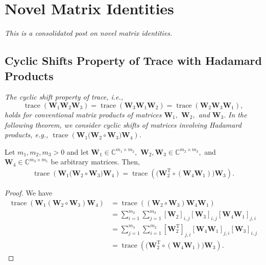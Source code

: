 \section{Novel Matrix Identities}

\emph{This is a consolidated post on novel matrix identities.}

\subsection{Cyclic Shifts Property of Trace with Hadamard Products}

\emph{The cyclic shift property of trace, i.e., 
\begin{equation*}
	\operatorname{trace}\left(\boldsymbol{W}_1\boldsymbol{W}_2\boldsymbol{W}_3\right) = \operatorname{trace}\left(\boldsymbol{W}_3\boldsymbol{W}_1\boldsymbol{W}_2\right) = \operatorname{trace}\left(\boldsymbol{W}_2\boldsymbol{W}_3\boldsymbol{W}_1\right),
\end{equation*}
holds for conventional matrix products of matrices $\boldsymbol{W}_1,$ $\boldsymbol{W}_2,$ and $\boldsymbol{W}_3.$ In the following theorem, we consider cyclic shifts of matrices involving Hadamard products, e.g., $\operatorname{trace}\left(\boldsymbol{W}_1\big(\boldsymbol{W}_2 \circ \boldsymbol{W}_3\big) \boldsymbol{W}_4\right).$}

\begin{theorem}
	\label{lemma:htoc}
	Let $m_1, m_2, m_3 > 0$ and let $\boldsymbol{W}_1 \in \mathbb{C}^{m_1\times m_2},$ $\boldsymbol{W}_2, \boldsymbol{W}_3 \in \mathbb{C}^{m_2\times m_3},$ and $\boldsymbol{W}_4 \in \mathbb{C}^{m_3\times m_1}$ be arbitrary matrices. Then,
	\begin{align}
		\operatorname{trace}\left(\boldsymbol{W}_1\big(\boldsymbol{W}_2 \circ \boldsymbol{W}_3\big) \boldsymbol{W}_4\right) = \operatorname{trace}\left(\big(\boldsymbol{W}_2^{\mathrm{T}} \circ (\boldsymbol{W}_4\boldsymbol{W}_1)\big) \boldsymbol{W}_3\right). \label{eqn:trh}
	\end{align}
\end{theorem}
\begin{proof}
	We have
	\begin{align}
		\operatorname{trace}\left(\boldsymbol{W}_1(\boldsymbol{W}_2 \circ \boldsymbol{W}_3) \boldsymbol{W}_4\right) &= \operatorname{trace}\left((\boldsymbol{W}_2 \circ \boldsymbol{W}_3) \boldsymbol{W}_4\boldsymbol{W}_1\right) \nonumber\\ &= \sum_{i=1}^{m_2} \sum_{j=1}^{m_3} [\boldsymbol{W}_2]_{i,j}[\boldsymbol{W}_3]_{i,j} [\boldsymbol{W}_4\boldsymbol{W}_1]_{j,i} \nonumber\\
		&= \sum_{j=1}^{m_3} \sum_{i=1}^{m_2}  [\boldsymbol{W}_2^{\mathrm{T}}]_{j,i} [\boldsymbol{W}_4\boldsymbol{W}_1]_{j,i} [\boldsymbol{W}_3]_{i,j} \nonumber\\&= \operatorname{trace}\left(\big(\boldsymbol{W}_2^{\mathrm{T}} \circ (\boldsymbol{W}_4\boldsymbol{W}_1)\big) \boldsymbol{W}_3\right).
	\end{align}
\end{proof}

